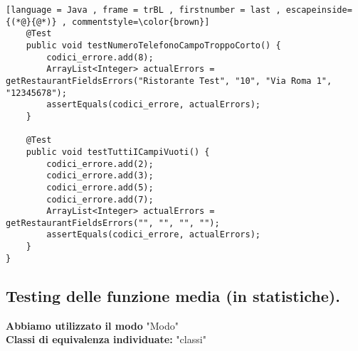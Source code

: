 \begin{lstlisting}[language = Java , frame = trBL , firstnumber = last , escapeinside={(*@}{@*)} , commentstyle=\color{brown}]
    @Test
    public void testNumeroTelefonoCampoTroppoCorto() {
        codici_errore.add(8);
        ArrayList<Integer> actualErrors = getRestaurantFieldsErrors("Ristorante Test", "10", "Via Roma 1", "12345678");
        assertEquals(codici_errore, actualErrors);
    }

    @Test
    public void testTuttiICampiVuoti() {
        codici_errore.add(2);
        codici_errore.add(3);
        codici_errore.add(5);
        codici_errore.add(7);
        ArrayList<Integer> actualErrors = getRestaurantFieldsErrors("", "", "", "");
        assertEquals(codici_errore, actualErrors);
    }
}
\end{lstlisting}





\subsection{Testing delle funzione media (in statistiche).}
\begin{flushleft}
    \textbf{Abbiamo utilizzato il modo} "Modo"\\
    \textbf{Classi di equivalenza individuate:} "classi"
\end{flushleft}
\vspace{0.2cm}
